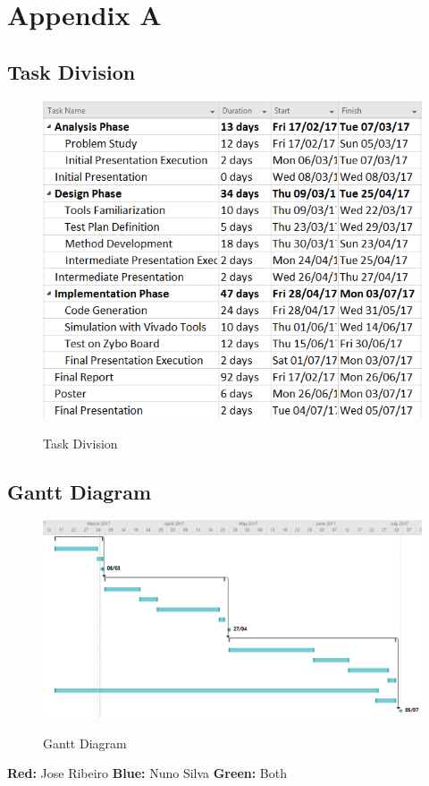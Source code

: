 
\section{Appendix A} %

\label{AppendixA} %

\subsection{Task Division}

\begin{figure}[!htbp]
\center
\label{figure4}
\includegraphics[scale=0.8]{Figures/TaskDivision} \\
\caption {Task Division}
\end{figure}

\subsection{Gantt Diagram}

\begin{figure}[!htbp]
\center
\label{figure5}
\includegraphics[scale=0.54]{Figures/Gantt} \\
\caption {Gantt Diagram}
\end{figure}
\textbf{Red:} Jose Ribeiro	\textbf{Blue:} Nuno Silva	\textbf{Green:} Both
